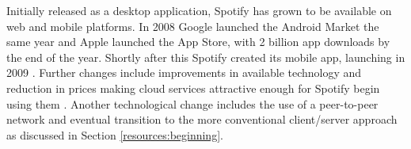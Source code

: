 \par
Initially released as a desktop application, Spotify has grown to be available on web and mobile platforms. In 2008 Google launched the Android Market the same year and Apple launched the App Store, with 2 billion app downloads by the end of the year. Shortly after this Spotify created its mobile app, launching in 2009 \parencite{apple_app_store_first_weekend, telegraph_top_10_highlights_2009, androind_market_release, spotify_mobile_release}. Further changes include improvements in available technology and reduction in prices making cloud services attractive enough for Spotify begin using them \parencite{spotify_announce_google_cloud}. Another technological change includes the use of a peer-to-peer network and eventual transition to the more conventional client/server approach as discussed in Section \ref{resources:beginning}.